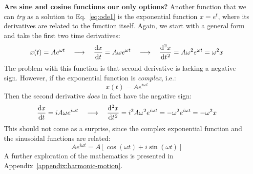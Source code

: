 \begin{remark}
  \textbf{Are sine and cosine functions our only options?} Another function
  that we can \emph{try} as a solution to Eq.~\ref{eq:ode1} is the exponential
  function $x=e^t$, where its derivatives are related to the function itself.
  Again, we start with a general form and take the first two time derivatives:
  \begin{equation*}
    x(t)=Ae^{\omega t}\quad\longrightarrow\quad
    \diff xt=A\omega e^{\omega t}\quad\longrightarrow\quad
    \diff[2] xt=A\omega^2 e^{\omega t}=\omega^2x
  \end{equation*}
  The problem with this function is that second derivative is lacking a
  negative sign. However, if the exponential function is \emph{complex}, i.e.:
  \begin{equation*}
    x(t)=Ae^{i\omega t}
  \end{equation*}
  Then the second derivative \emph{does} in fact have the negative sign:
  \begin{equation*}
    \diff xt=iA\omega e^{i\omega t}\quad\longrightarrow\quad
    \diff[2] xt=i^2A\omega^2 e^{i\omega t}=-\omega^2 e^{i\omega t}=-\omega^2x
  \end{equation*}
  This should not come as a surprise, since the complex exponential function
  and the sinusoidal functions are related:
  \begin{equation*}
    Ae^{i\omega t}=A\left[\cos(\omega t)+i\sin(\omega t)\right]
  \end{equation*}
  A further exploration of the mathematics is presented in
  Appendix~\ref{appendix:harmonic-motion}.
\end{remark}




